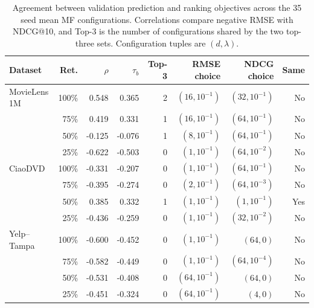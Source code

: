 \begin{table}[H]
\centering
\caption{Agreement between validation prediction and ranking objectives across the 35 seed mean MF configurations. Correlations compare negative RMSE with NDCG@10, and Top-3 is the number of configurations shared by the two top-three sets. Configuration tuples are $(d,\lambda)$.}
\label{tab:configuration-agreement}
\small
\begin{tabular}{@{}lrrrrrrr@{}}
\toprule
Dataset & Ret. & $\rho$ & $\tau_b$ & Top-3 & RMSE choice & NDCG choice & Same \\
\midrule
MovieLens 1M & 100\% & 0.548 & 0.365 & 2 & $(16,10^{-1})$ & $(32,10^{-1})$ & No \\
 & 75\% & 0.419 & 0.331 & 1 & $(16,10^{-1})$ & $(64,10^{-1})$ & No \\
 & 50\% & -0.125 & -0.076 & 1 & $(8,10^{-1})$ & $(64,10^{-1})$ & No \\
 & 25\% & -0.622 & -0.503 & 0 & $(1,10^{-1})$ & $(64,10^{-2})$ & No \\
\addlinespace
CiaoDVD & 100\% & -0.331 & -0.207 & 0 & $(1,10^{-1})$ & $(64,10^{-1})$ & No \\
 & 75\% & -0.395 & -0.274 & 0 & $(2,10^{-1})$ & $(64,10^{-3})$ & No \\
 & 50\% & 0.385 & 0.332 & 1 & $(1,10^{-1})$ & $(1,10^{-1})$ & Yes \\
 & 25\% & -0.436 & -0.259 & 0 & $(1,10^{-1})$ & $(32,10^{-2})$ & No \\
\addlinespace
Yelp--Tampa & 100\% & -0.600 & -0.452 & 0 & $(1,10^{-1})$ & $(64,0)$ & No \\
 & 75\% & -0.582 & -0.449 & 0 & $(1,10^{-1})$ & $(64,10^{-4})$ & No \\
 & 50\% & -0.531 & -0.408 & 0 & $(64,10^{-1})$ & $(64,0)$ & No \\
 & 25\% & -0.451 & -0.324 & 0 & $(64,10^{-1})$ & $(4,0)$ & No \\
\bottomrule
\end{tabular}
\end{table}
